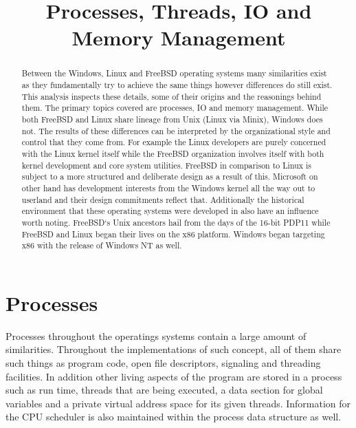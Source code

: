 \documentclass[letterpaper,10pt,draftclsnofoot,onecolumn]{IEEEtran}
\begin{document}
\title{Processes, Threads, IO and Memory Management}

\author{
}

\maketitle
\begin{abstract}
Between the Windows, Linux and FreeBSD operating systems many similarities exist as they fundamentally try to achieve the same things however differences do still exist. This analysis inspects these details, some of their origins and the reasonings behind them. The primary topics covered are processes, IO and memory management. While both FreeBSD and Linux share lineage from Unix (Linux via Minix), Windows does not. The results of these differences can be interpreted by the organizational style and control that they come from. For example the Linux developers are purely concerned with the Linux kernel itself while the FreeBSD organization involves itself with both kernel development and core system utilities. FreeBSD in comparison to Linux is subject to a more structured and deliberate design as a result of this. Microsoft on other hand has development interests from the Windows kernel all the way out to userland and their design commitments reflect that. Additionally the historical environment that these operating systems were developed in also have an influence worth noting. FreeBSD`s Unix ancestors hail from the days of the 16-bit PDP11 while FreeBSD and Linux began their lives on the x86 platform. Windows began targeting x86 with the release of Windows NT as well.
\end{abstract}
\pagebreak

\tableofcontents
\pagebreak
\section{Processes}
Processes throughout the operatings systems contain a large amount of similarities. Throughout the implementations of such concept, all of them share such things as program code, open file descriptors, signaling and threading facilities. In addition other living aspects of the program are stored in a process such as run time, threads that are being executed, a data section for global variables and a private virtual address space for its given threads. Information for the CPU scheduler is also maintained within the process data structure as well.\\
\end{document}
